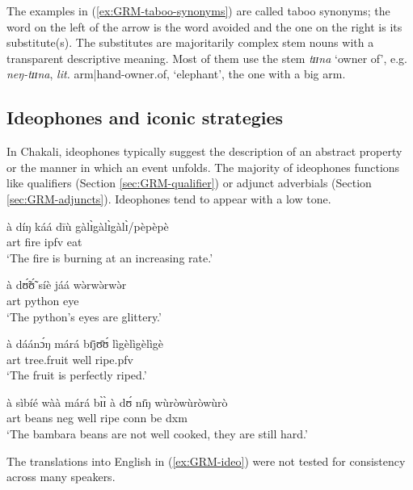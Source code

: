 \begin{exe}
\begin{exe}
\begin{exe}
{\begin{exe}
\begin{exe}
\begin{exe}
\begin{exe}
\begin{exe}
\begin{exe}
\begin{exe}
\begin{xlist}
\begin{exe}
\begin{exe}
\begin{exe}
\begin{exe}
\begin{exe}
\begin{exe}
\begin{exe}
\begin{exe}
\begin{exe}
\begin{exe}
\begin{exe}
\begin{exe}
\begin{exe}
\begin{exe}
\begin{exe}
\z


The examples in (\ref{ex:GRM-taboo-synonyms})  are called  
taboo  synonyms; the word on the left of the arrow is the word 
avoided and the one on the right is its substitute(s).   The substitutes  are 
majoritarily complex stem nouns with a transparent descriptive meaning. Most 
of them use the stem {\it tɪɪna} `owner of', e.g. {\it neŋ-tɪɪna}, {\it lit.} 
arm|hand-owner.of,  `elephant',  the one with a big arm. 


\subsection{Ideophones and iconic strategies}
\label{sec:GRM-onoma}

 In Chakali, ideophones typically suggest the description of an abstract 
property or the manner in which an event unfolds.  The majority of ideophones 
functions like  qualifiers (Section \ref{sec:GRM-qualifier}) or adjunct 
adverbials  (Section \ref{sec:GRM-adjuncts}). Ideophones  tend to appear with a 
low tone. 
                               

\ea\label{ex:GRM-ideo}

 \ea\label{ex:GRM-ideo-dxm}
\gll  à díŋ káá dīù gàlɪ̀gàlɪ̀gàlɪ̀/pèpèpè\\
{\sc art} fire {\sc ipfv} eat  {\ideo}\\
  \glt `The fire is burning at an increasing rate.'


 \ex\label{ex:GRM-ideo-qual}
\gll à dʊ̃́ʊ̃́ síè jáá wə̀rwə̀rwə̀r\\
{\sc art} python eye {\ident} {\ideo} \\
  \glt `The python's eyes are glittery.'

   \ex\label{ex:GRM-ideo-}
\gll à dáánɔ́ŋ márá bɪ̄jʊ̄ʊ́ lìgèlìgèlìgè\\
{\sc art} tree.fruit well ripe.{\sc pfv}  {\ideo} \\
  \glt `The fruit is perfectly riped.'
  
  
     \ex\label{ex:GRM-ideo-}
\gll à sìbíé wàà márá bɪ̀ɪ̀ à dʊ́ nɪ̄ŋ wùròwùròwùrò\\
{\sc art} beans  {\sc neg} well ripe {\sc conn} be   {\sc dxm} {\ideo}\\
  \glt `The bambara beans are not well cooked, they are still hard.'
  

\z 
 \z

The translations into English in (\ref{ex:GRM-ideo}) were not 
tested for consistency across many speakers.


\end{exe}
\end{exe}
\end{exe}
\end{exe}
\end{exe}
\end{exe}
\end{exe}
\end{exe}
\end{exe}
\end{exe}
\end{exe}
\end{exe}
\end{exe}
\end{exe}
\end{exe}
\end{xlist}
\end{exe}
\end{exe}
\end{exe}
\end{exe}
\end{exe}
\end{exe}
\end{exe}}
\end{exe}
\end{exe}
\end{exe}
